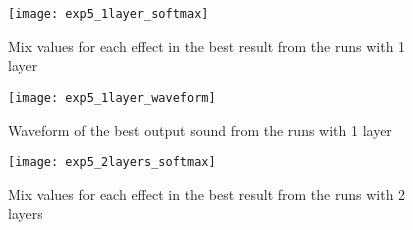 
\begin{figure}[h]
    \centering
    \texttt{[image: exp5\_1layer\_softmax]}
    \caption{Mix values for each effect in the best result from the runs with 1 layer}
    \label{fig:exp5_1layer_softmax}
\end{figure}

\begin{figure}[h]
    \centering
    \texttt{[image: exp5\_1layer\_waveform]}
    \caption{Waveform of the best output sound from the runs with 1 layer}
    \label{fig:exp5_1layer_waveform}
\end{figure}

\begin{figure}[h]
    \centering
    \texttt{[image: exp5\_2layers\_softmax]}
    \caption{Mix values for each effect in the best result from the runs with 2 layers}
    \label{fig:exp5_2layers_softmax}
\end{figure}
